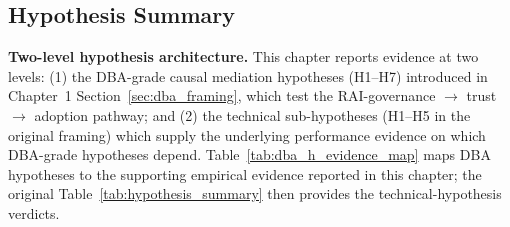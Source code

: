 \subsection{Hypothesis Summary}

\noindent\textbf{Two-level hypothesis architecture.} This chapter reports evidence at two levels: (1) the DBA-grade causal mediation hypotheses (H1--H7) introduced in Chapter~1 Section~\ref{sec:dba_framing}, which test the RAI-governance $\to$ trust $\to$ adoption pathway; and (2) the technical sub-hypotheses (H1--H5 in the original framing) which supply the underlying performance evidence on which DBA-grade hypotheses depend. Table~\ref{tab:dba_h_evidence_map} maps DBA hypotheses to the supporting empirical evidence reported in this chapter; the original Table~\ref{tab:hypothesis_summary} then provides the technical-hypothesis verdicts.


